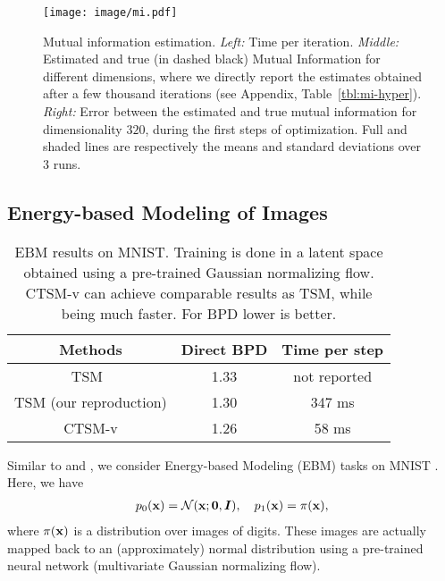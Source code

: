 \begin{figure}[ht]
\vskip 0.2in
\begin{center}
\centerline{\texttt{[image: image/mi.pdf]}}
\caption{Mutual information estimation.
\textit{Left:} Time per iteration. 
\textit{Middle:} Estimated and true (in dashed black) Mutual Information for different dimensions, where we directly report the estimates obtained after a few thousand iterations (see Appendix, Table~\ref{tbl:mi-hyper}). 
\textit{Right:} Error between the estimated and true mutual information for dimensionality $320$, during the first steps of optimization. Full and shaded lines are respectively the means and standard deviations over $3$ runs.
}
\label{fig:mi}
\end{center}
\vskip -0.2in
\end{figure}


\subsection{Energy-based Modeling of Images}

\begin{table}[h]
\begin{center}
\caption{EBM results on MNIST. Training is done in a latent space obtained using a pre-trained Gaussian normalizing flow. CTSM-v can achieve comparable results as TSM, while being much faster. For BPD lower is better.}
\begin{tabular}{|c|c|c|}
  \hline
  Methods &
  Direct BPD &
  Time per step 
  \\
  \hline
  TSM~\citep{choi2022densityratio}
   & 1.33 & not reported \\
  \hline
  TSM (our reproduction) & 1.30 & 347 ms \\
  \hline
  CTSM-v  & 1.26 & 58 ms \\
  \hline
\end{tabular}
\end{center}
\end{table}

Similar to \citet{Rhodes2020} and \citet{choi2022densityratio}, we consider Energy-based Modeling (EBM) tasks on MNIST \citep{lecun2010mnist}.
Here, we have
\begin{align}
    p_0(\operatorname{\mathbf{x}}) 
    = 
    \mathcal{N}(\operatorname{\mathbf{x}}; \mathbf{0}, {\bm{I}}),
    \quad
    p_1(\operatorname{\mathbf{x}}) 
    = 
    \pi(\operatorname{\mathbf{x}})
    ,
\end{align}
where $\pi(\operatorname{\mathbf{x}})$ is a distribution over images of digits. These images  are actually mapped back to an (approximately) normal distribution using a pre-trained neural network (multivariate Gaussian normalizing flow). 

